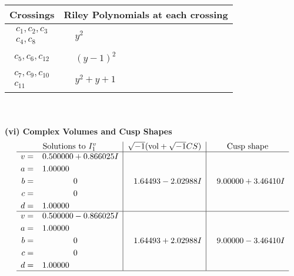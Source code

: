 \documentclass[1p]{elsarticle_modified}
\theoremstyle{definition}
\newcommand{\I}{\sqrt{-1}}
\begin{document}
\begin{tabular}{m{50pt}|m{274pt}}
Crossings & \hspace{64pt}Riley Polynomials at each crossing \\
\hline $$\begin{aligned}c_{1},c_{2},c_{3}\\c_{4},c_{8}\end{aligned}$$&$\begin{aligned}
&y^2
\end{aligned}$\\
\hline $$\begin{aligned}c_{5},c_{6},c_{12}\end{aligned}$$&$\begin{aligned}
&(y-1)^2
\end{aligned}$\\
\hline $$\begin{aligned}c_{7},c_{9},c_{10}\\c_{11}\end{aligned}$$&$\begin{aligned}
&y^2+y+1
\end{aligned}$\\
\hline
\end{tabular}\\~\\
\newpage\flushleft \textbf{(vi) Complex Volumes and Cusp Shapes}
$$\begin{array}{c|c|c}  
\text{Solutions to }I^v_{1}& \I (\text{vol} + \sqrt{-1}CS) & \text{Cusp shape}\\
 \hline 
\begin{aligned}
v &= \phantom{-}0.500000 + 0.866025 I \\
a &= \phantom{-}1.00000\phantom{ +0.000000I} \\
b &= \phantom{-0.000000 } 0 \\
c &= \phantom{-0.000000 } 0 \\
d &= \phantom{-}1.00000\phantom{ +0.000000I}\end{aligned}
 & \phantom{-}1.64493 - 2.02988 I & \phantom{-}9.00000 + 3.46410 I \\ \hline\begin{aligned}
v &= \phantom{-}0.500000 - 0.866025 I \\
a &= \phantom{-}1.00000\phantom{ +0.000000I} \\
b &= \phantom{-0.000000 } 0 \\
c &= \phantom{-0.000000 } 0 \\
d &= \phantom{-}1.00000\phantom{ +0.000000I}\end{aligned}
 & \phantom{-}1.64493 + 2.02988 I & \phantom{-}9.00000 - 3.46410 I\\
 \hline 
 \end{array}$$\newpage\newpage\renewcommand{\arraystretch}{1}
\end{document}
